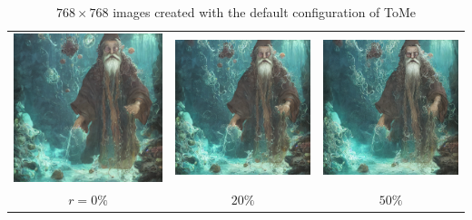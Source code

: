 \begin{table}[!htb]
\centering
\begin{tabular}{c c c}
    \includegraphics[width=0.3\linewidth]{static/sample_imgs/secondary/wizard_0.png} & \includegraphics[width=0.3\linewidth]{static/sample_imgs/secondary/wizard_20.png} &
    \includegraphics[width=0.3\linewidth]{static/sample_imgs/secondary/wizard_50.png}\\
    \(r=0\%\) & \(20\%\) & \(50\%\) \\
\end{tabular}
\caption{$768 \times 768$ images created with the default configuration of ToMe}
\end{table}
